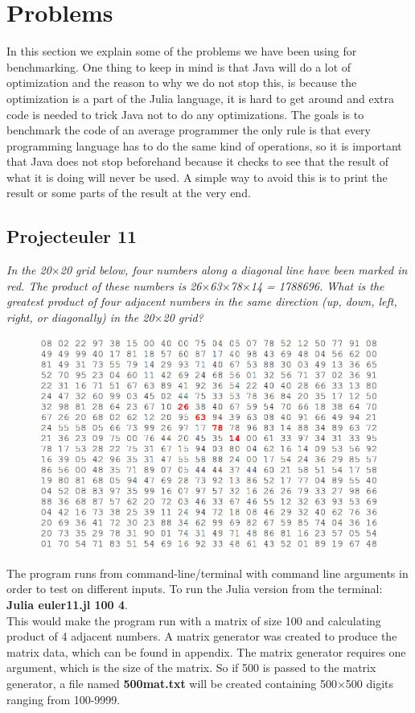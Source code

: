 \documentclass[a4paper, 11pt, titlepage]{article}
\begin{document}
\section{Problems}
In this section we explain some of the problems we have been using for benchmarking. One thing to keep in mind is that Java will do a lot of optimization and the reason to why we do not stop this, is because the optimization is a part of the Julia language, it is hard to get around and extra code is needed to trick Java not to do any optimizations. The goals is to benchmark the code of an average programmer the only rule is that every programming language has to do the same kind of operations, so it is important that Java does not stop beforehand because it checks to see that the result of what it is doing will never be used. A simple way to avoid this is to print the result or some parts of the result at the very end.
\subsection{Projecteuler 11}
\textit{In the 20$\times$20 grid below, four numbers along a diagonal line have been marked in red. The product of these numbers is 26$\times$63$\times$78$\times$14 = 1788696. What is the greatest product of four adjacent numbers in the same direction (up, down, left, right, or diagonally) in the 20$\times$20 grid?}
\begin{figure}[H]
	\begin{center}
	\includegraphics[scale=0.30]{image/11.jpg}
	\label{11}
	\end{center}
\end{figure}
The program runs from command-line/terminal with command line arguments in order to test on different inputs. To run the Julia version from the terminal: \\
\textbf{Julia euler11.jl 100 4}. \\
This would make the program run with a matrix of size 100 and calculating product of 4 adjacent numbers. A matrix generator was created to produce the matrix data,  which can be found in appendix. The matrix generator requires one argument, which is the size of the matrix. So if 500 is passed to the matrix generator, a file named \textbf{500mat.txt} will be created containing 500$\times$500 digits ranging from 100-9999.
\end{document}
